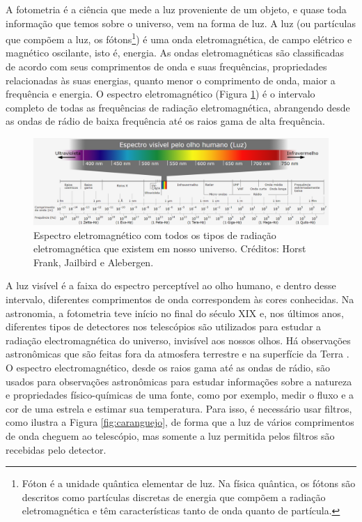 A fotometria é a ciência que mede a luz proveniente de um objeto, e quase toda informação que temos sobre o universo, vem na forma de luz. A luz (ou partículas que compõem a luz, os fótons\footnote{Fóton é a unidade quântica elementar de luz. Na física quântica, os fótons são descritos como partículas discretas de energia que compõem a radiação eletromagnética e têm características tanto de onda quanto de partícula.}) é uma onda eletromagnética, de campo elétrico e magnético oscilante, isto é, energia. As ondas eletromagnéticas são classificadas de acordo com seus comprimentos de onda e suas frequências, propriedades relacionadas às suas energias, quanto menor o comprimento de onda, maior a frequência e energia. O espectro eletromagnético (Figura \ref{fig:espectro}) é o intervalo completo de todas as frequências de radiação eletromagnética, abrangendo desde as ondas de rádio de baixa frequência até os raios gama de alta frequência.

\begin{figure}[h]
  \centering 
  \includegraphics[width=1.0\textwidth]{Imagens/espectro.PNG} 
  \caption[Espectro eletromagnético.]{Espectro eletromagnético com todos os tipos de radiação eletromagnética que existem em nosso universo. Créditos: Horst Frank, Jailbird e Alebergen.}
  \label{fig:espectro} 
\end{figure}

A luz visível é a faixa do espectro perceptível ao olho humano, e dentro desse intervalo, diferentes comprimentos de onda correspondem às cores conhecidas. Na astronomia, a fotometria teve início no final do século XIX e, nos últimos anos, diferentes tipos de detectores nos telescópios são utilizados para estudar a radiação electromagnética do universo, invisível aos nossos olhos. Há observações astronômicas que são feitas fora da atmosfera terrestre e na superfície da Terra \cite{2023Kepler}. O espectro electromagnético, desde os raios gama até as ondas de rádio, são usados para observações astronômicas para estudar informações sobre a natureza e propriedades físico-químicas de uma fonte, como por exemplo, medir o fluxo e a cor de uma estrela e estimar sua temperatura. Para isso, é necessário usar filtros, como ilustra a Figura \ref{fig:caranguejo}, de forma que a luz de vários comprimentos de onda cheguem ao telescópio, mas somente a luz permitida pelos filtros são recebidas pelo detector.
 
